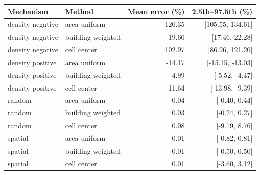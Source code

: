 \begin{tabular}{llrr}\toprule
Mechanism & Method & Mean error (\%) & 2.5th--97.5th (\%)\\\midrule
density negative & area uniform & 120.35 & [105.55, 134.61] \\
density negative & building weighted & 19.60 & [17.46, 22.28] \\
density negative & cell center & 102.97 & [86.96, 121.20] \\
density positive & area uniform & -14.17 & [-15.15, -13.03] \\
density positive & building weighted & -4.99 & [-5.52, -4.47] \\
density positive & cell center & -11.64 & [-13.98, -9.39] \\
random & area uniform & 0.04 & [-0.40, 0.44] \\
random & building weighted & 0.03 & [-0.24, 0.27] \\
random & cell center & 0.08 & [-9.19, 8.76] \\
spatial & area uniform & 0.01 & [-0.82, 0.81] \\
spatial & building weighted & 0.01 & [-0.50, 0.50] \\
spatial & cell center & 0.01 & [-3.60, 3.12] \\
\bottomrule\end{tabular}
